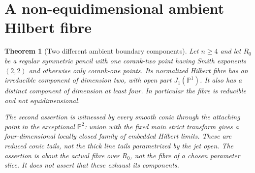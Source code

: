 \documentclass[11pt,reqno]{amsart}
\numberwithin{equation}{section}
\newtheorem{theorem}{Theorem}[section]
\theoremstyle{definition}\newtheorem{definition}[theorem]{Definition}
\theoremstyle{remark}\newtheorem{remark}[theorem]{Remark}
\newcommand{\Pj}{\mathbb P}\newcommand{\A}{\mathbb A}
\begin{document}
\section{A non-equidimensional ambient Hilbert fibre}
\label{sec:nonequidimensional-v162}
\begin{theorem}[Two different ambient boundary components]
\label{thm:nonequidimensional-v162}
Let $n\geq4$ and let $R_0$ be a regular symmetric pencil with one
corank-two point having Smith exponents $(2,2)$ and otherwise only
corank-one points. Its normalized Hilbert fibre has an irreducible
component of dimension two, with open part $J_1(\Pj^1)$. It also
has a distinct component of dimension at least four. In particular
the fibre is reducible and not equidimensional.

The second assertion is witnessed by every smooth conic through
the attaching point in the exceptional $\Pj^2$: union with the
fixed main strict transform gives a four-dimensional locally closed
family of embedded Hilbert limits. These are reduced conic tails,
not the thick line tails parametrized by the jet open. The assertion
is about the actual fibre over $R_0$, not the fibre of a chosen
parameter slice. It does not assert that these exhaust its components.
\end{theorem}
\end{document}
